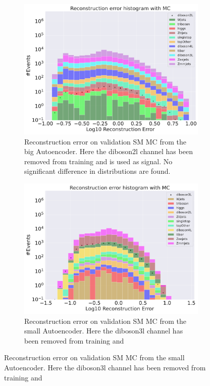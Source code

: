 \begin{figure}[h!]
\begin{subfigure}{.45\textwidth}
        \includegraphics[width=\textwidth]{Figures/VAE_testing/big/b_data_recon_big_rm3_feats_sig_diboson2l.pdf}
        \caption{Reconstruction error on validation SM MC from the big Autoencoder. Here the diboson2l channel has been removed from training and 
        is used as signal. No significant difference in distributions are found. }
        \label{fig:vae_big_diboson2l}
    \end{subfigure}
    \hfill 
    \begin{subfigure}{.45\textwidth}
        \includegraphics[width=\textwidth]{Figures/VAE_testing/small/b_data_recon_big_rm3_feats_sig_diboson3l.pdf}
        \caption{Reconstruction error on validation SM MC from the small Autoencoder. Here the diboson3l channel has been removed from training and 
}
\end{subfigure}
\end{figure}
